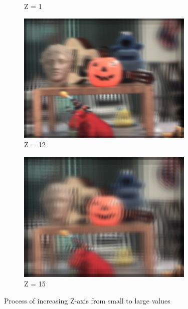 \documentclass{article}
\begin{document}
\begin{figure}[htbp]
\begin{subfigure}[b]{0.24\textwidth}
        \caption{Z = 1} %
    \end{subfigure}
    \hfill
    \begin{subfigure}[b]{0.24\textwidth} %
        \centering
        \includegraphics[width=\textwidth]{z=12.png} %
        \caption{Z = 12} %
    \end{subfigure}
    \hfill
    \begin{subfigure}[b]{0.24\textwidth} %
        \centering
        \includegraphics[width=\textwidth]{z=15.png} %
        \caption{Z = 15} %
    \end{subfigure}
    
    \caption{Process of increasing Z-axis from small to large values}
    \label{fig:zaxis_example}
\end{figure}
\end{document}
